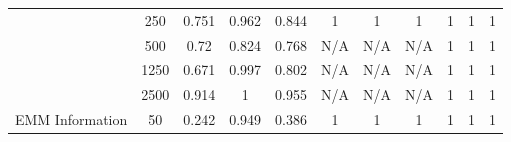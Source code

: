 \begin{table*}[]
{\begin{tabular}{ccccccccccc}
			\multicolumn{1}{|c|}{}                                            & \multicolumn{1}{c|}{250}           & \multicolumn{1}{c|}{0.751}                   & \multicolumn{1}{c|}{0.962}                & \multicolumn{1}{c|}{0.844}            & \multicolumn{1}{c|}{1}                        & \multicolumn{1}{c|}{1}                     & \multicolumn{1}{c|}{1}                 & \multicolumn{1}{c|}{1}                      & \multicolumn{1}{c|}{1}                   & \multicolumn{1}{c|}{1}               \\ \cline{2-11}
			\multicolumn{1}{|c|}{}                                            & \multicolumn{1}{c|}{500}           & \multicolumn{1}{c|}{0.72}                    & \multicolumn{1}{c|}{0.824}                & \multicolumn{1}{c|}{0.768}            & \multicolumn{1}{c|}{N/A}                      & \multicolumn{1}{c|}{N/A}                   & \multicolumn{1}{c|}{N/A}               & \multicolumn{1}{c|}{1}                      & \multicolumn{1}{c|}{1}                   & \multicolumn{1}{c|}{1}               \\ \cline{2-11}
			\multicolumn{1}{|c|}{}                                            & \multicolumn{1}{c|}{1250}          & \multicolumn{1}{c|}{0.671}                   & \multicolumn{1}{c|}{0.997}                & \multicolumn{1}{c|}{0.802}            & \multicolumn{1}{c|}{N/A}                        & \multicolumn{1}{c|}{N/A}                     & \multicolumn{1}{c|}{N/A}                 & \multicolumn{1}{c|}{1}                      & \multicolumn{1}{c|}{1}                   & \multicolumn{1}{c|}{1}               \\ \cline{2-11}
			\multicolumn{1}{|c|}{}                                            & \multicolumn{1}{c|}{2500}          & \multicolumn{1}{c|}{0.914}                   & \multicolumn{1}{c|}{1}                    & \multicolumn{1}{c|}{0.955}            & \multicolumn{1}{c|}{N/A}                        & \multicolumn{1}{c|}{N/A}                     & \multicolumn{1}{c|}{N/A}                 & \multicolumn{1}{c|}{1}                      & \multicolumn{1}{c|}{1}                   & \multicolumn{1}{c|}{1}               \\ \hline
			\multicolumn{1}{|c|}{\multirow{6}{*}{EMM Information}}            & \multicolumn{1}{c|}{50}            & \multicolumn{1}{c|}{0.242}                   & \multicolumn{1}{c|}{0.949}                & \multicolumn{1}{c|}{0.386}            & \multicolumn{1}{c|}{1}                      & \multicolumn{1}{c|}{1}                   & \multicolumn{1}{c|}{1}               & \multicolumn{1}{c|}{1}                      & \multicolumn{1}{c|}{1}                   & \multicolumn{1}{c|}{1}               \\ \cline{2-11}

\end{tabular}}
\end{table*}
